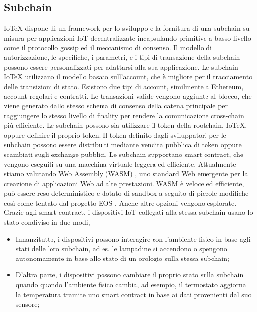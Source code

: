 \documentclass[a4paper,12pt]{article}
\begin{document}
\subsection{Subchain}
IoTeX dispone di un framework per lo sviluppo e la fornitura di una subchain su misura
per applicazioni IoT decentralizzate incapsulando primitive a basso livello come il protocollo gossip
ed il meccanismo di consenso. Il modello di autorizzazione, le specifiche, i parametri,
e i tipi di transazione della subchain possono essere personalizzati per adattarsi alla sua applicazione.
Le subchain IoTeX utilizzano il modello basato sull'account, che è migliore per il tracciamento delle transizioni di stato.
Esistono due tipi di account, similmente a Ethereum, account regolari e
contratti. Le transazioni valide vengono aggiunte al blocco, che viene generato dallo stesso
schema di consenso della catena principale per raggiungere lo stesso livello di finality per rendere la comunicazione cross-chain più efficiente. Le subchain possono sia utilizzare il token della rootchain, IoTeX, oppure definire il proprio token. Il token definito dagli sviluppatori per le subchain possono essere distribuiti mediante vendita pubblica di token oppure scambiati sugli exchange pubblici.
Le subchain supportano smart contract, che vengono eseguiti su una macchina virtuale leggera ed efficiente. Attualmente stiamo valutando Web Assembly (WASM) \cite{c36}, uno standard Web emergente per la creazione di applicazioni Web ad alte prestazioni. WASM è veloce ed efficiente, può essere reso deterministico e dotato di sandbox a seguito di piccole modifiche così come tentato dal progetto EOS \cite{c9}. Anche altre opzioni vengono esplorate. Grazie agli smart contract, i dispositivi IoT collegati alla stessa subchain usano lo stato condiviso in due modi,

\begin{itemize}
	\item Innanzitutto, i dispositivi possono interagire con l'ambiente fisico in base agli stati delle loro subchain, ad es. le lampadine si accendono o spengono autonomamente in base allo stato di un orologio sulla stessa subchain;

	\item D'altra parte, i dispositivi possono cambiare il proprio stato sulla subchain quando
	      quando l'ambiente fisico cambia, ad esempio, il termostato aggiorna la temperatura tramite uno smart contract in base ai dati provenienti dal suo sensore;
\end{itemize}
\end{document}
